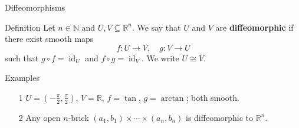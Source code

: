 
\date{29 October 2025}



\begin{frame}
  \cmctitleframe
\end{frame}


\begin{frame}{Diffeomorphisms}
\vspace{-0.2cm}
\begin{block}{Definition}
Let $n\in\mathbb{N}$ and $U,V\subseteq\mathbb{R}^n$. We say that $U$ and $V$ are \textbf{diffeomorphic} if there exist smooth maps
\[
f:U\to V, \quad g:V\to U
\]
such that $g\circ f=\operatorname{id}_U$ and $f\circ g=\operatorname{id}_V$. We write $U\cong V.$
\end{block}
\vspace{-0.2cm}
\begin{exampleblock}{Examples}
\begin{enumerate}
\item[1] $U=(-\frac{\pi}{2},\frac{\pi}{2})$, $V=\mathbb{R}$,
$f=\tan$, $g=\arctan$; both smooth.
\item[2] Any open $n$-brick $(a_1,b_1)\times\cdots\times(a_n,b_n)$ is diffeomorphic to $\mathbb{R}^n$.
\end{enumerate}
\end{exampleblock}
\end{frame}

